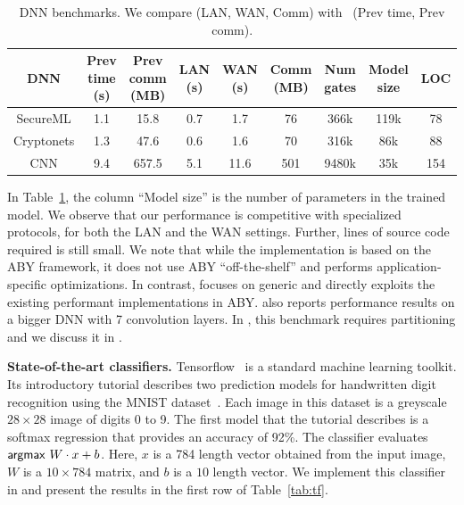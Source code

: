 \setlength\tabcolsep{2.5pt}
\begin{table}
\footnotesize
\begin{tabular}{|c|c|c|c |c|c|c|c|c|}
\hline
DNN  & \thead{Prev \\ time\\ (s)} & \thead{Prev \\ comm\\ (MB)} & \thead{LAN  \\ (s)} & \thead{WAN\\ (s)} & \thead{Comm \\(MB)} & \thead{Num \\ gates} & \thead{Model\\ size} & LOC\\
\hline
SecureML   &  1.1 & 15.8 & 0.7 & 1.7  & 76   &   366k   & 119k & 78\\
\hline
Cryptonets &  1.3 & 47.6 & 0.6 & 1.6  & 70    &  316k & 86k & 88\\
\hline
CNN        &  9.4 & 657.5& 5.1 & 11.6 & 501  & 9480k & 35k & 154\\
\hline
\end{tabular}

 \caption{DNN benchmarks. We compare \tool (LAN, WAN, Comm)
 with~\cite{minionn} (Prev time, Prev comm).}
 \label{tab:nn} 
\end{table}


In Table~\ref{tab:nn}, 
the column ``Model size'' is the number of parameters in the
trained model.
We observe that our performance is competitive with specialized
\minion protocols, for both the LAN and the WAN settings. Further, lines
of \tool source code required is still small. 
We note that while the \minion implementation is based on the ABY framework, it does not use ABY ``off-the-shelf'' and performs application-specific optimizations. In contrast, \tool focuses on generic
\mpc and directly exploits the existing performant implementations in ABY.
\minion also reports performance results on a bigger DNN with 7
convolution layers. In \tool, this benchmark requires partitioning and
we discuss it in .

\noindent\textbf{State-of-the-art classifiers.}
Tensorflow~\cite{tensorflow} is a standard machine learning toolkit.
Its introductory tutorial describes two prediction models for handwritten digit recognition
using the MNIST dataset~\cite{mnist}.
Each image in this dataset is a greyscale $28\times 28$ image of
digits 0 to 9.
The first model that the tutorial describes is a softmax regression
that provides an accuracy of 92\%. The classifier evaluates
$ \mathsf{argmax}\ W\cdot x+b$.
Here, $x$ is a 784 length vector obtained from the input image,
 $W$ is a $10\times 784$ matrix, and  $b$ is a $10$ length
vector.
We implement this classifier in \tool and present the results in the
first row of Table~\ref{tab:tf}. 



